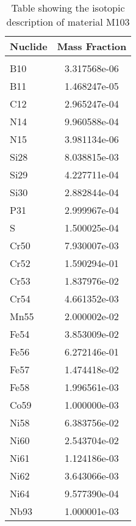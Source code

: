 \begin{centering}
\begin{table}[ht!]
\begin{tabular}{l | c}
\hline
Nuclide & Mass Fraction\\
\hline
\\
B10 & 3.317568e-06\\
B11 & 1.468247e-05\\
C12 & 2.965247e-04\\
N14 & 9.960588e-04\\
N15 & 3.981134e-06\\
Si28 & 8.038815e-03\\
Si29 & 4.227711e-04\\
Si30 & 2.882844e-04\\
P31 & 2.999967e-04\\
S & 1.500025e-04\\
Cr50 & 7.930007e-03\\
Cr52 & 1.590294e-01\\
Cr53 & 1.837976e-02\\
Cr54 & 4.661352e-03\\
Mn55 & 2.000002e-02\\
Fe54 & 3.853009e-02\\
Fe56 & 6.272146e-01\\
Fe57 & 1.474418e-02\\
Fe58 & 1.996561e-03\\
Co59 & 1.000000e-03\\
Ni58 & 6.383756e-02\\
Ni60 & 2.543704e-02\\
Ni61 & 1.124186e-03\\
Ni62 & 3.643066e-03\\
Ni64 & 9.577390e-04\\
Nb93 & 1.000001e-03
\end{tabular}
\caption{Table showing the isotopic description of material M103}
\label{table:material_M103}
\end{table}\clearpage


\end{centering}
